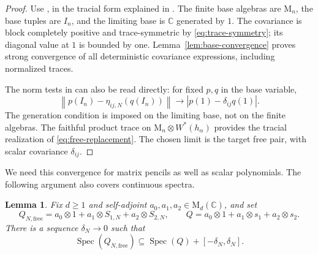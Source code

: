 \documentclass[11pt]{article}
\newtheorem{lemma}[theorem]{Lemma}
\DeclareMathOperator{\Spec}{Spec}
\newcommand{\C}{\mathbb C}
\newcommand{\M}{\mathrm M}
\newcommand{\norm}[1]{\left\|#1\right\|}
\begin{document}
\begin{proof}
Use \cite[Corollary~1.4 and Examples~2.5(3)]{GK}, in the tracial
form explained in \cite[Theorem~4.3]{JLNP}.
The finite base algebras are $\M_n$, the base tuples are $I_n$,
and the limiting base is $\C$ generated by $1$.
The covariance is block completely positive and trace-symmetric
by \eqref{eq:trace-symmetry}; its diagonal value at $1$ is bounded by one.
Lemma~\ref{lem:base-convergence} proves strong convergence of all
deterministic covariance expressions, including normalized traces.

The norm tests in \cite[Examples~2.5(3)]{GK} can also be read directly:
for fixed $p,q$ in the base variable,
\[
 \norm{p(I_n)-\eta_{ij,N}(q(I_n))}
 \longrightarrow |p(1)-\delta_{ij}q(1)|.
\]
The generation condition is imposed on the limiting base, not on
the finite algebras. The faithful product trace on
$\M_n\otimes W^*(h_\alpha)$ provides the tracial realization of
\eqref{eq:free-replacement}. The chosen limit is the target free pair,
with scalar covariance $\delta_{ij}$.
\end{proof}

We need this convergence for matrix pencils as well as scalar
polynomials. The following argument also covers continuous spectra.

\begin{lemma}\label{lem:free-spectra}
Fix $d\ge1$ and self-adjoint $a_0,a_1,a_2\in\M_d(\C)$, and set
\[
 Q_{N,\mathrm{free}}=a_0\otimes1+
                   a_1\otimes S_{1,N}+a_2\otimes S_{2,N},\qquad
 Q=a_0\otimes1+a_1\otimes s_1+a_2\otimes s_2.
\]
There is a sequence $\delta_N\to0$ such that
\[
 \Spec(Q_{N,\mathrm{free}})
       \subseteq\Spec(Q)+[-\delta_N,\delta_N].
\]
\end{lemma}
\end{document}
